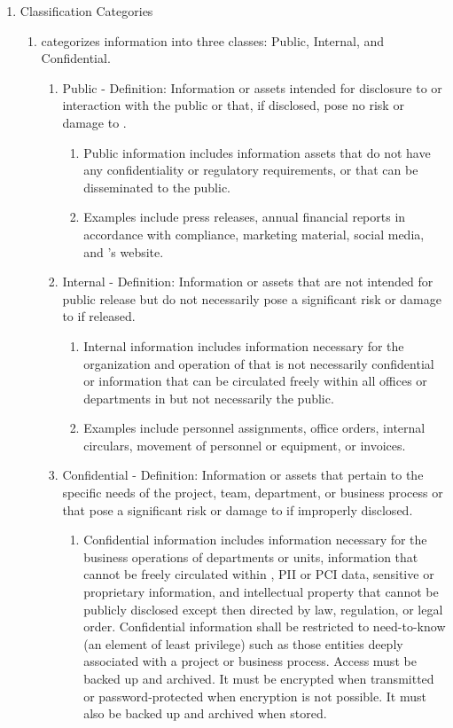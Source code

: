 \documentclass[../main.tex]{subfiles}
\begin{document}
\begin{enumerate}
\begin{enumerate}
    \end{enumerate}
    \item Classification Categories
    \begin{enumerate}
        \item \CompanyName categorizes information into three classes: Public, Internal, and Confidential.
        \begin{enumerate}
            \item Public - Definition: Information or assets intended for disclosure to or interaction with the public or that, if disclosed, pose no risk or damage to \CompanyName.
            \begin{enumerate}
                \item Public information includes information assets that do not have any confidentiality or regulatory requirements, or that can be disseminated to the public.
                \item Examples include press releases, annual financial reports in accordance with compliance, marketing material, social media, and \CompanyName's website.
            \end{enumerate}
            \item Internal - Definition: Information or assets that are not intended for public release but do not necessarily pose a significant risk or damage to \CompanyName if released.
            \begin{enumerate}
                \item Internal information includes information necessary for the organization and operation of \CompanyName that is not necessarily confidential or information that can be circulated freely within all offices or departments in \CompanyName but not necessarily the public.
                \item Examples include personnel assignments, office orders, internal circulars, movement of personnel or equipment, or invoices.
            \end{enumerate}
            \item Confidential - Definition: Information or assets that pertain to the specific needs of the project, team, department, or business process or that pose a significant risk or damage to \CompanyName if improperly disclosed.
            \begin{enumerate}
                \item Confidential information includes information necessary for the business operations of departments or units, information that cannot be freely circulated within \CompanyName, PII or PCI data, sensitive or proprietary information, and intellectual property that cannot be publicly disclosed except then directed by law, regulation, or legal order. Confidential information shall be restricted to need-to-know (an element of least privilege) such as those entities deeply associated with a project or business process. Access must be backed up and archived. It must be encrypted when transmitted or password-protected when encryption is not possible. It must also be backed up and archived when stored.

\end{enumerate}
\end{enumerate}
\end{enumerate}
\end{enumerate}
\end{document}
